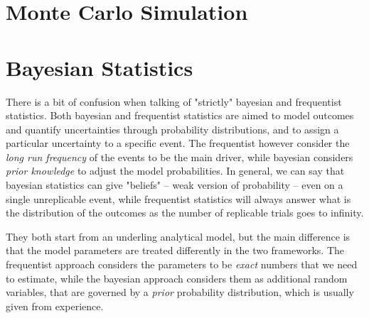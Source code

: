 \documentclass[12pt,a4paper]{article}
\begin{document}
\section{Monte Carlo Simulation}

\section{Bayesian Statistics}
There is a bit of confusion when talking of "strictly" bayesian and frequentist statistics.
Both bayesian and frequentist statistics are aimed to model outcomes and quantify uncertainties through probability distributions, and to assign a particular uncertainty to a specific event. The frequentist however consider the \textit{long run frequency} of the events to be the main driver, while bayesian considers \textit{prior knowledge} to adjust the model probabilities.
In general, we can say that bayesian statistics can give "beliefs" -- weak version of probability -- even on a single unreplicable event, while frequentist statistics will always answer what is the distribution of the outcomes as the number of replicable trials goes to infinity.

They both start from an underling analytical model, but the main difference is that the model parameters are treated differently in the two frameworks.
The frequentist approach considers the parameters to be \textit{exact} numbers that we need to estimate, while the bayesian approach considers them as additional random variables, that are governed by a \textit{prior} probability distribution, which is usually given from experience.
\end{document}
